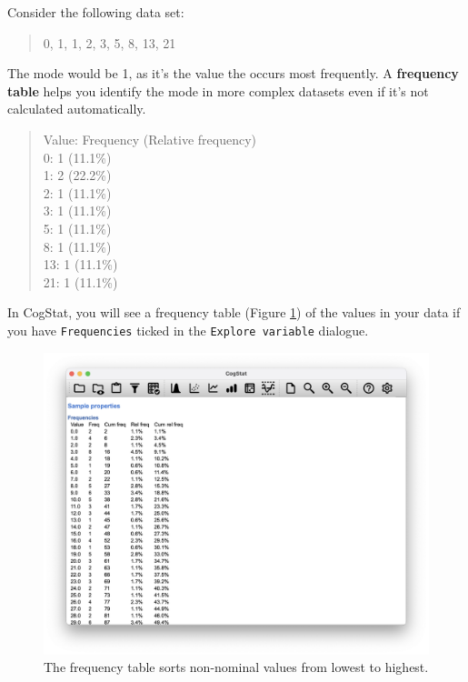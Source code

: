 \documentclass[
  11pt,
  a4paper,
  twoside,symmetric,openright]{book}
\theoremstyle{break}
\theoremstyle{break}
\begin{document}
\begin{example}[Mode]
\protect\hypertarget{exm:exmode}{}\label{exm:exmode}

Consider the following data set:

\begin{quote}
0, 1, 1, 2, 3, 5, 8, 13, 21
\end{quote}

The mode would be 1, as it's the value the occurs most frequently. A \textbf{frequency table} helps you identify the mode in more complex datasets even if it's not calculated automatically.

\begin{quote}
Value: Frequency (Relative frequency)\\
0: 1 (11.1\%)\\
1: 2 (22.2\%)\\
2: 1 (11.1\%)\\
3: 1 (11.1\%)\\
5: 1 (11.1\%)\\
8: 1 (11.1\%)\\
13: 1 (11.1\%)\\
21: 1 (11.1\%)\\
\end{quote}

\end{example}

In CogStat, you will see a frequency table (Figure \ref{fig:freqaflsmall}) of the values in your data if you have \texttt{Frequencies} ticked in the \texttt{Explore\ variable} dialogue.

\begin{figure}

{\centering \includegraphics[width=0.6\linewidth]{resources/image/cogstatfrequencyaflsmall} 

}

\caption{The frequency table sorts non-nominal values from lowest to highest.}\label{fig:freqaflsmall}
\end{figure}
\end{document}
